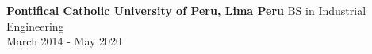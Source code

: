 \documentclass[10pt, letterpaper]{article}
\newenvironment{twocolentry}[2][]{
    \onecolentry
    \def\secondColumn{#2}
    \setcolumnwidth{\fill, 4.5 cm}
    \begin{paracol}{2}
}{
    \switchcolumn \raggedleft \secondColumn
    \end{paracol}
    \endonecolentry
} %
\begin{document}
\begin{twocolentry}{March 2014 - May 2020} %
    \small \textbf{Pontifical Catholic University of Peru, Lima Peru} \textbar BS in Industrial Engineering\\
\end{twocolentry}



\end{document}

